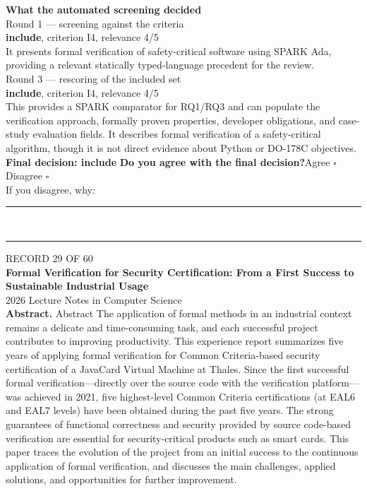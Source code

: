 \documentclass[11pt,a4paper]{article}
\begin{document}
{\small\textbf{What the automated screening decided}}\\[2mm]
{\footnotesize\color{soft}Round 1 --- screening against the criteria}\\[0.5mm]
{\small\textbf{include}, criterion I4, relevance 4/5}\\[0.5mm]
{\small It presents formal verification of safety-critical software using SPARK Ada, providing a relevant statically typed-language precedent for the review.}\\[2.5mm]
{\footnotesize\color{soft}Round 3 --- rescoring of the included set}\\[0.5mm]
{\small\textbf{include}, criterion I4, relevance 4/5}\\[0.5mm]
{\small This provides a SPARK comparator for RQ1/RQ3 and can populate the verification approach, formally proven properties, developer obligations, and case-study evaluation fields. It describes formal verification of a safety-critical algorithm, though it is not direct evidence about Python or DO-178C objectives.}\\[2.5mm]
{\small\textbf{Final decision: include}}
\vspace{2mm}
{\small\textbf{Do you agree with the final decision?}\quad{}Agree $\square$\qquad{}Disagree $\square$}\\[1mm]
{\footnotesize\color{soft}If you disagree, why:}\\[1mm]
\color{rule}\rule{\linewidth}{0.3pt}\\[3mm]\rule{\linewidth}{0.3pt}\color{black}
\clearpage
{\color{soft}\footnotesize RECORD 29 OF 60}\\[1mm]
{\large\bfseries Formal Verification for Security Certification: From a First Success to Sustainable Industrial Usage}\\[1.5mm]
{\color{soft}\small 2026 \textperiodcentered{} Lecture Notes in Computer Science}\\[2mm]
{\small\textbf{Abstract.} Abstract The application of formal methods in an industrial context remains a delicate and time-consuming task, and each successful project contributes to improving productivity. This experience report summarizes five years of applying formal verification for Common Criteria-based security certification of a JavaCard Virtual Machine at Thales. Since the first successful formal verification---directly over the source code with the verification platform---was achieved in 2021, five highest-level Common Criteria certifications (at EAL6 and EAL7 levels) have been obtained during the past five years. The strong guarantees of functional correctness and security provided by source code-based verification are essential for security-critical products such as smart cards. This paper traces the evolution of the project from an initial success to the continuous application of formal verification, and discusses the main challenges, applied solutions, and opportunities for further improvement.}
\end{document}
